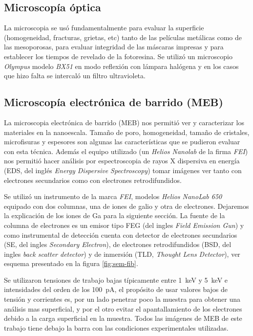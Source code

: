 	\subsection{Microscopía óptica}

		La microscopia se usó fundamentalmente para evaluar la superficie (homogeneidad, fracturas, grietas, etc) tanto de las películas metálicas como de las mesoporosas, para evaluar integridad de las máscaras impresas y para establecer los tiempos de revelado de la fotoresina. Se utilizó un microscopio \textit{Olympus} modelo \textit{BX51} en modo reflexión con lámpara halógena y en los casos que hizo falta se intercaló un filtro ultravioleta.

	
	\subsection{Microscopía electrónica de barrido (MEB)}\label{sec:SEM}

		La microscopia electrónica de barrido (MEB) nos permitió ver y caracterizar los materiales en la nanoescala. Tamaño de poro, homogeneidad, tamaño de cristales, microfisuras y espesores son algunas las características que se pudieron evaluar con esta técnica. Además el equipo utilizado (un \textit{Helios Nanolab} de la firma \textit{FEI}) nos permitió hacer análisis por espectroscopia de rayos X dispersiva en energía (EDS, del inglés \textit{Energy Dispersive Spectroscopy}) tomar imágenes ver tanto con electrones secundarios como con electrones retrodifundidos. \cite{Goodhew2000,Watt1997}

		Se utilizó un instrumento de la marca \textit{FEI}, modelos \textit{Helios NanoLab 650} equipado con dos columnas, una de iones de galio y otra de electrones. Dejaremos la explicación de los iones de Ga para la siguiente sección. La fuente de la columna de electrones es un emisor tipo FEG (del ingles \textit{Field Emission Gun}) y como instrumental de detección cuenta con detector de electrones secundarios (SE, del ingles \textit{Secondary Electron}), de electrones retrodifundidos (BSD, del ingles \textit{back scatter detector}) y de inmersión (TLD, \textit{Thought Lens Detector}), ver esquema presentado en la figura \ref{fig:sem-fib}. 

		Se utilizaron tensiones de trabajo bajas típicamente entre \SI{1}{\kilo\electronvolt} y \SI{5}{\kilo\electronvolt} e intensidades del orden de los \SI{100}{\pA}, el propósito de usar valores bajos de tensión y corrientes es, por un lado penetrar poco la muestra para obtener una análisis mas superficial, y por el otro evitar el apantallamiento de los electrones debido a la carga superficial en la muestra. Todos las imágenes de MEB de este trabajo tiene debajo la barra con las condiciones experimentales utilizadas.


